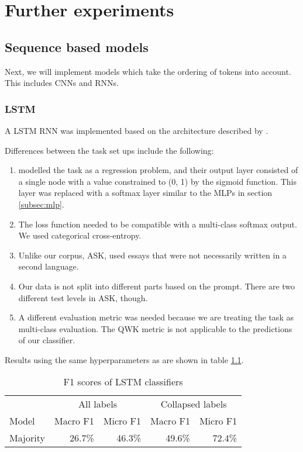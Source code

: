 \chapter{Further experiments}

\section{Sequence based models}

Next, we will implement models which take the ordering of tokens into account.
This includes \acp{CNN} and \acp{RNN}. 

\subsection{LSTM}

A \ac{LSTM} \ac{RNN} was implemented based on the architecture described
by \textcite{taghipour16}.

Differences between the task set ups include the following:

\begin{enumerate}
    \item \citeauthor{taghipour16} modelled the task as a regression problem,
        and their output layer consisted of a single node with a value constrained
        to (0, 1) by the sigmoid function. This layer was replaced with a softmax
        layer similar to the \acp{MLP} in section \ref{subsec:mlp}.
    \item The loss function needed to be compatible with a multi-class softmax
        output. We used categorical cross-entropy.
    \item Unlike our corpus, ASK, \citeauthor{taghipour16} used essays that were
        not necessarily written in a second language.
    \item Our data is not split into different parts based on the prompt. There
        are two different test levels in ASK, though.
    \item A different evaluation metric was needed because we are treating the task
        as multi-class evaluation. The \ac{QWK} metric is not applicable to
        the predictions of our classifier.
\end{enumerate}

Results using the same hyperparameters as \citeauthor{taghipour16} are shown
in table \ref{lstm-results}.

\begin{table}
  \centering
  \begin{tabular}{|l|rr|rr|}
    \toprule
             & \multicolumn{2}{c|}{All labels} & \multicolumn{2}{c|}{Collapsed labels} \\
    Model      & Macro F1        & Micro F1        & Macro F1        & Micro F1       \\
    \midrule
    Majority   &         26.7\%  &         46.3\%  &         49.6\%  &         72.4\% \\
    \bottomrule
  \end{tabular}
  \caption{F1 scores of LSTM classifiers}
  \label{lstm-results}
\end{table}
